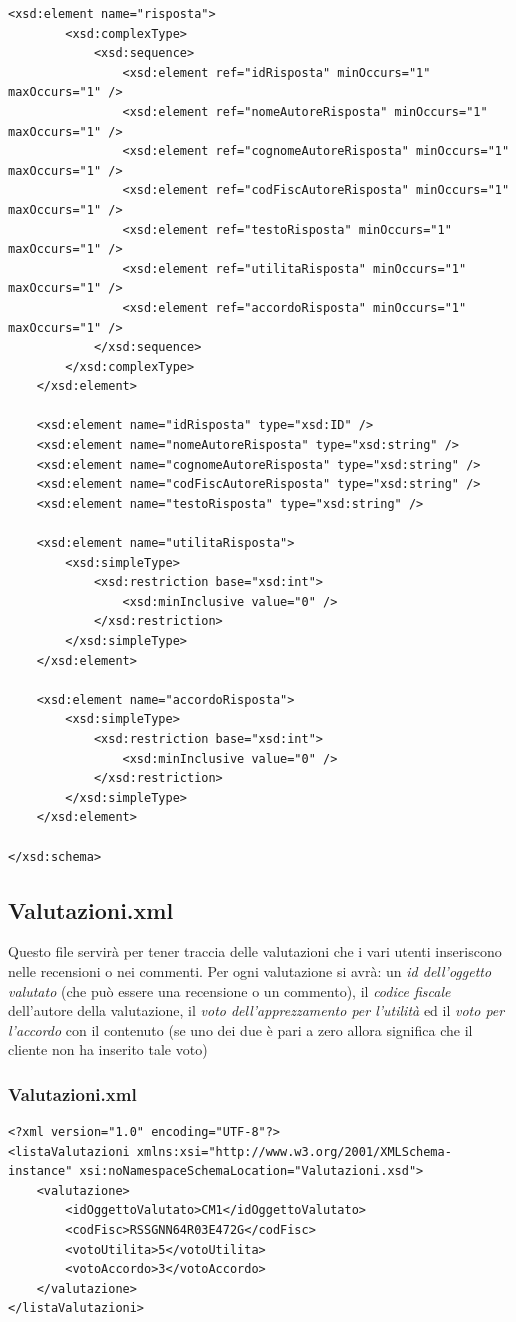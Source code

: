 \documentclass [a4paper, 12pt]{book}
\begin{document}
\begin{lstlisting}[style=XML]
    <xsd:element name="risposta">
        <xsd:complexType>
            <xsd:sequence>
                <xsd:element ref="idRisposta" minOccurs="1" maxOccurs="1" />
                <xsd:element ref="nomeAutoreRisposta" minOccurs="1" maxOccurs="1" />
                <xsd:element ref="cognomeAutoreRisposta" minOccurs="1" maxOccurs="1" />
                <xsd:element ref="codFiscAutoreRisposta" minOccurs="1" maxOccurs="1" />
                <xsd:element ref="testoRisposta" minOccurs="1" maxOccurs="1" />
                <xsd:element ref="utilitaRisposta" minOccurs="1" maxOccurs="1" />
                <xsd:element ref="accordoRisposta" minOccurs="1" maxOccurs="1" />
            </xsd:sequence>
        </xsd:complexType>
    </xsd:element>

    <xsd:element name="idRisposta" type="xsd:ID" />
    <xsd:element name="nomeAutoreRisposta" type="xsd:string" />
    <xsd:element name="cognomeAutoreRisposta" type="xsd:string" />
    <xsd:element name="codFiscAutoreRisposta" type="xsd:string" />
    <xsd:element name="testoRisposta" type="xsd:string" />

    <xsd:element name="utilitaRisposta">
        <xsd:simpleType>
            <xsd:restriction base="xsd:int">
                <xsd:minInclusive value="0" />
            </xsd:restriction>
        </xsd:simpleType>
    </xsd:element>

    <xsd:element name="accordoRisposta">
        <xsd:simpleType>
            <xsd:restriction base="xsd:int">
                <xsd:minInclusive value="0" />
            </xsd:restriction>
        </xsd:simpleType>
    </xsd:element>

</xsd:schema>
\end{lstlisting}

\subsection{Valutazioni.xml}
Questo file servirà per tener traccia delle valutazioni che i vari utenti inseriscono nelle recensioni o nei commenti. Per ogni valutazione si avrà: un \textit{id dell'oggetto valutato} (che può essere una recensione o un commento), il \textit{codice fiscale} dell'autore della valutazione, il \textit{voto dell'apprezzamento per l'utilità} ed il \textit{voto per l'accordo} con il contenuto (se uno dei due è pari a zero allora significa che il cliente non ha inserito tale voto)

\subsubsection{Valutazioni.xml}
\begin{lstlisting}[style=XML]
<?xml version="1.0" encoding="UTF-8"?>
<listaValutazioni xmlns:xsi="http://www.w3.org/2001/XMLSchema-instance" xsi:noNamespaceSchemaLocation="Valutazioni.xsd">
    <valutazione>
        <idOggettoValutato>CM1</idOggettoValutato>
        <codFisc>RSSGNN64R03E472G</codFisc>
        <votoUtilita>5</votoUtilita>
        <votoAccordo>3</votoAccordo>
    </valutazione>
</listaValutazioni>
\end{lstlisting}
\end{document}
